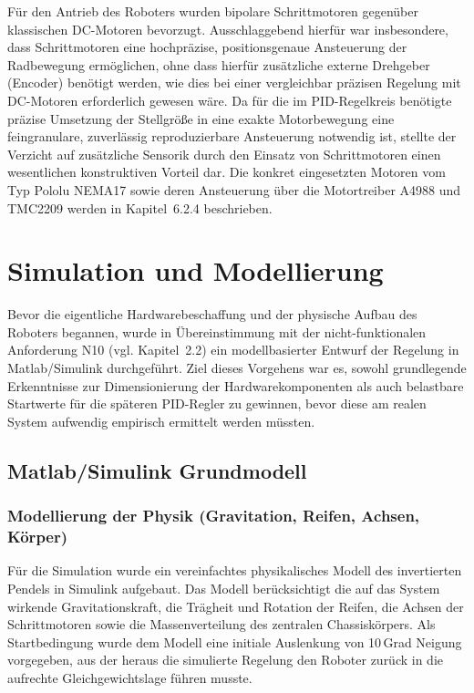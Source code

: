 \documentclass[12pt,ngerman,numbers=noenddot,abstracton,headsepline]{scrreprt}
\begin{document}
Für den Antrieb des Roboters wurden bipolare Schrittmotoren gegenüber klassischen DC-Motoren bevorzugt. Ausschlaggebend hierfür war insbesondere, dass Schrittmotoren eine hochpräzise, positionsgenaue Ansteuerung der Radbewegung ermöglichen, ohne dass hierfür zusätzliche externe Drehgeber (Encoder) benötigt werden, wie dies bei einer vergleichbar präzisen Regelung mit DC-Motoren erforderlich gewesen wäre. Da für die im PID-Regelkreis benötigte präzise Umsetzung der Stellgröße in eine exakte Motorbewegung eine feingranulare, zuverlässig reproduzierbare Ansteuerung notwendig ist, stellte der Verzicht auf zusätzliche Sensorik durch den Einsatz von Schrittmotoren einen wesentlichen konstruktiven Vorteil dar. Die konkret eingesetzten Motoren vom Typ Pololu NEMA17 sowie deren Ansteuerung über die Motortreiber A4988 und TMC2209 werden in Kapitel~6.2.4 beschrieben.

\chapter{Simulation und Modellierung}
\label{ch:simulation}

Bevor die eigentliche Hardwarebeschaffung und der physische Aufbau des Roboters begannen, wurde in Übereinstimmung mit der nicht-funktionalen Anforderung N10 (vgl. Kapitel~2.2) ein modellbasierter Entwurf der Regelung in Matlab/Simulink durchgeführt. Ziel dieses Vorgehens war es, sowohl grundlegende Erkenntnisse zur Dimensionierung der Hardwarekomponenten als auch belastbare Startwerte für die späteren PID-Regler zu gewinnen, bevor diese am realen System aufwendig empirisch ermittelt werden müssten.

\section{Matlab/Simulink Grundmodell}
\label{sec:simulink_grundmodell}

\subsection{Modellierung der Physik (Gravitation, Reifen, Achsen, Körper)}
\label{subsec:simulink_physik}

Für die Simulation wurde ein vereinfachtes physikalisches Modell des invertierten Pendels in Simulink aufgebaut. Das Modell berücksichtigt die auf das System wirkende Gravitationskraft, die Trägheit und Rotation der Reifen, die Achsen der Schrittmotoren sowie die Massenverteilung des zentralen Chassiskörpers. Als Startbedingung wurde dem Modell eine initiale Auslenkung von 10\,Grad Neigung vorgegeben, aus der heraus die simulierte Regelung den Roboter zurück in die aufrechte Gleichgewichtslage führen musste.
\end{document}
